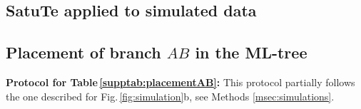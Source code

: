 \begin{appendices}
\renewcommand\thefigure{S\arabic{figure}} %
{} 

\renewcommand\thetable{S\arabic{table}} %
{} 
    
\tableofcontents


\clearpage

\section{SatuTe applied to simulated data}

\subsection{Placement of branch $AB$ in the ML-tree}

\noindent\textbf{Protocol for Table\,\ref{supptab:placementAB}:} This protocol partially follows the one described for Fig.\,\ref{fig:simulation}b, see Methods \ref{msec:simulations}.


\end{appendices}
